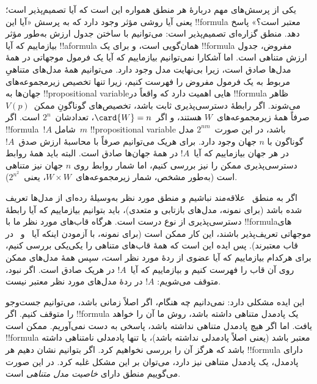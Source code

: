 \documentclass[../../../include/open-logic-section]{subfiles}
\begin{document}


یکی از پرسش‌های مهم دربارهٔ هر منطق همواره این است که آیا تصمیم‌پذیر
است؛ یعنی آیا روشی مؤثر وجود دارد که به پرسش «آیا این !!{formula}
معتبر است؟» پاسخ دهد. منطق گزاره‌ای تصمیم‌پذیر است: می‌توانیم با ساختن
جدول ارزش به‌طور مؤثر بیازماییم که آیا !!a{formula} همان‌گویی است، و
برای یک !!{formula} مفروض، جدول ارزش متناهی است. اما آشکارا نمی‌توانیم
بیازماییم که آیا یک فرمول موجهاتی در همهٔ مدل‌ها صادق است، زیرا
بی‌نهایت مدل وجود دارد. می‌توانیم همهٔ مدل‌های متناهیِ مربوط به یک
فرمول مفروض را فهرست کنیم، زیرا تنها تخصیص زیرمجموعه‌های جهان‌ها به
!!{propositional variable}هایی اهمیت دارد که واقعاً در !!{formula}
ظاهر می‌شوند. اگر رابطهٔ دسترسی‌پذیری ثابت باشد، تخصیص‌های گوناگونِ
ممکن~$V(p)$ صرفاً همهٔ زیرمجموعه‌های~$W$ هستند، و اگر~$\card{W} = n$،
تعدادشان~$2^n$ است. اگر !!{formula}~$!A$ شامل~$m$
!!{propositional variable} باشد، در این صورت~$2^{nm}$ مدل گوناگون با
$n$ جهان وجود دارد. برای هریک می‌توانیم صرفاً با محاسبهٔ ارزش صدق~$!A$
در هر جهان بیازماییم که آیا~$!A$ در همهٔ جهان‌ها صادق است. البته باید
همهٔ روابط دسترسی‌پذیری ممکن را نیز بررسی کنیم، اما شمار روابط روی
$n$ جهان نیز متناهی است (به‌طور مشخص، شمار زیرمجموعه‌های~$W \times W$،
یعنی~$2^{n^2}$).

اگر به منطق~ علاقه‌مند نباشیم و منطق مورد نظر به‌وسیلهٔ رده‌ای
از مدل‌ها تعریف شده باشد (برای نمونه، مدل‌های بازتابی و متعدی)، باید
بتوانیم بیازماییم که آیا رابطهٔ دسترسی‌پذیری از نوع درست است. هرگاه
قاب‌های مورد نظر ما با !!{formula}های موجهاتی تعریف‌پذیر باشند، این
کار ممکن است (برای نمونه، با آزمودن اینکه آیا~ و~ در قاب
معتبرند). پس ایده این است که همهٔ قاب‌های متناهی را یکی‌یکی بررسی
کنیم، برای هرکدام بیازماییم که آیا عضوی از ردهٔ مورد نظر است، سپس همهٔ
مدل‌های ممکن روی آن قاب را فهرست کنیم و بیازماییم که آیا~$!A$ در هریک
صادق است. اگر نبود، متوقف می‌شویم: $!A$ در ردهٔ مدل‌های مورد نظر معتبر
نیست.

این ایده مشکلی دارد: نمی‌دانیم چه هنگام، اگر اصلاً زمانی باشد، می‌توانیم
جست‌وجو را متوقف کنیم. اگر !!{formula} یک پادمدل متناهی داشته باشد،
روش ما آن را خواهد یافت. اما اگر هیچ پادمدل متناهی نداشته باشد، پاسخی
به دست نمی‌آوریم. ممکن است !!{formula} معتبر باشد (یعنی اصلاً پادمدلی
نداشته باشد)، یا تنها پادمدلی نامتناهی داشته باشد که هرگز آن را بررسی
نخواهیم کرد. اگر بتوانیم نشان دهیم هر !!{formula} دارای پادمدل، یک
پادمدل متناهی نیز دارد، می‌توان بر این مشکل غلبه کرد. در این صورت
می‌گوییم منطق دارای \emph{خاصیت مدل متناهی} است.
\end{document}
